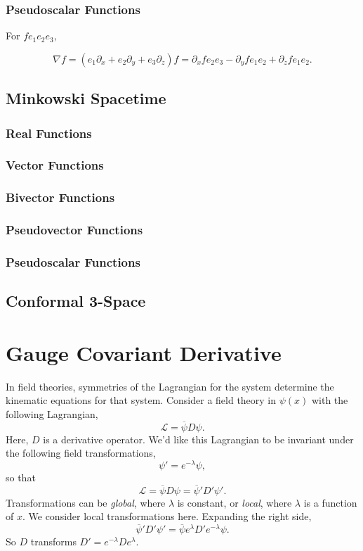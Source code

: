 	\subsubsection{Pseudoscalar Functions}
	
	For $fe_1e_2e_3,$
	
	\[
	\nabla f = \left(e_1\partial_x + e_2\partial_y + e_3\partial_z\right) f = \partial_x fe_2e_3 - \partial_yfe_1e_2 + \partial_zf e_1e_2. 
	\]
	
	\subsection{Minkowski Spacetime}
	\subsubsection{Real Functions}
	\subsubsection{Vector Functions}
	\subsubsection{Bivector Functions}
	\subsubsection{Pseudovector Functions}
	\subsubsection{Pseudoscalar Functions}
	\subsection{Conformal 3-Space}
	
	\section{Gauge Covariant Derivative}
	
	In field theories, symmetries of the Lagrangian for the system determine the kinematic equations for that system. Consider a field theory in $\psi\left(x\right)$ with the following Lagrangian,	
	\[
	\mathcal{L} = \overline{\psi} D \psi.
	\]	
	Here, $D$ is a derivative operator. We'd like this Lagrangian to be invariant under the following field transformations,	
	\[
	\psi' = e^{-\lambda}\psi,
	\]	
	so that	
	\[
	\mathcal{L} = \overline{\psi} D \psi = \overline{\psi}' D' \psi'.
	\]	
	Transformations can be \emph{global}, where $\lambda$ is constant, or \emph{local}, where $\lambda$ is a function of $x$. We consider local transformations here. Expanding the right side,	
	\[
	\overline{\psi}' D' \psi' = \overline{\psi}e^{\lambda} D'e^{-\lambda}\psi.
	\]	
	So $D$ transforms $D' = e^{-\lambda} De^{\lambda}.$
	
